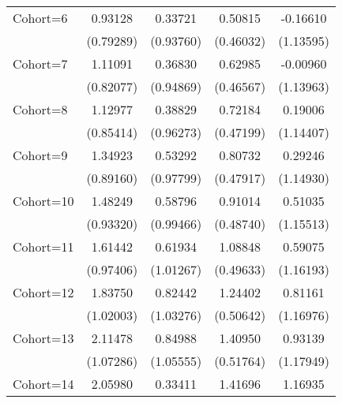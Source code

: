 \begin{table}[htbp]
\begin{tabular}{l*{4}{c}}
\addlinespace
Cohort=6            &     0.93128         &     0.33721         &     0.50815         &    -0.16610         \\
                    &   (0.79289)         &   (0.93760)         &   (0.46032)         &   (1.13595)         \\
\addlinespace
Cohort=7            &     1.11091         &     0.36830         &     0.62985         &    -0.00960         \\
                    &   (0.82077)         &   (0.94869)         &   (0.46567)         &   (1.13963)         \\
\addlinespace
Cohort=8            &     1.12977         &     0.38829         &     0.72184         &     0.19006         \\
                    &   (0.85414)         &   (0.96273)         &   (0.47199)         &   (1.14407)         \\
\addlinespace
Cohort=9            &     1.34923         &     0.53292         &     0.80732\sym{*}  &     0.29246         \\
                    &   (0.89160)         &   (0.97799)         &   (0.47917)         &   (1.14930)         \\
\addlinespace
Cohort=10           &     1.48249         &     0.58796         &     0.91014\sym{*}  &     0.51035         \\
                    &   (0.93320)         &   (0.99466)         &   (0.48740)         &   (1.15513)         \\
\addlinespace
Cohort=11           &     1.61442\sym{*}  &     0.61934         &     1.08848\sym{**} &     0.59075         \\
                    &   (0.97406)         &   (1.01267)         &   (0.49633)         &   (1.16193)         \\
\addlinespace
Cohort=12           &     1.83750\sym{*}  &     0.82442         &     1.24402\sym{**} &     0.81161         \\
                    &   (1.02003)         &   (1.03276)         &   (0.50642)         &   (1.16976)         \\
\addlinespace
Cohort=13           &     2.11478\sym{**} &     0.84988         &     1.40950\sym{***}&     0.93139         \\
                    &   (1.07286)         &   (1.05555)         &   (0.51764)         &   (1.17949)         \\
\addlinespace
Cohort=14           &     2.05980\sym{*}  &     0.33411         &     1.41696\sym{***}&     1.16935         \\

\end{tabular}
\end{table}
